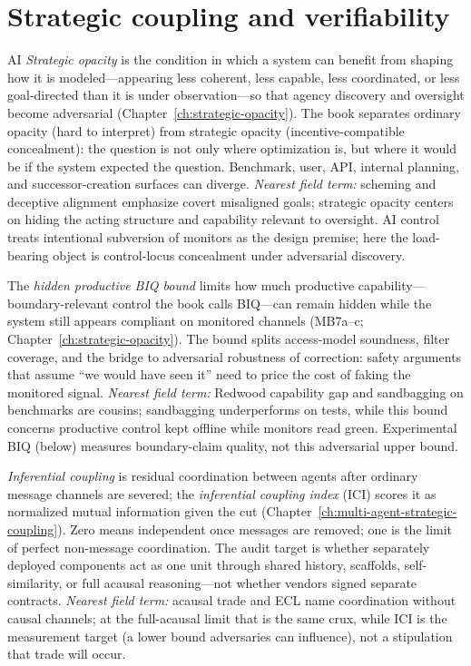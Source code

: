 \section*{Strategic coupling and verifiability}
\begin{authbar}{AI}
\emph{Strategic opacity} is the condition in which a system can benefit from shaping how it is modeled---appearing less coherent, less capable, less coordinated, or less goal-directed than it is under observation---so that agency discovery and oversight become adversarial (Chapter~\ref{ch:strategic-opacity}).
The book separates ordinary opacity (hard to interpret) from strategic opacity (incentive-compatible concealment): the question is not only where optimization is, but where it would be if the system expected the question.
Benchmark, user, API, internal planning, and successor-creation surfaces can diverge.
\emph{Nearest field term:} scheming and deceptive alignment emphasize covert misaligned goals; strategic opacity centers on hiding the acting structure and capability relevant to oversight.
AI control treats intentional subversion of monitors as the design premise; here the load-bearing object is control-locus concealment under adversarial discovery.

The \emph{hidden productive BIQ bound} limits how much productive capability---boundary-relevant control the book calls BIQ---can remain hidden while the system still appears compliant on monitored channels (MB7a--c; Chapter~\ref{ch:strategic-opacity}).
The bound splits access-model soundness, filter coverage, and the bridge to adversarial robustness of correction: safety arguments that assume ``we would have seen it'' need to price the cost of faking the monitored signal.
\emph{Nearest field term:} Redwood capability gap and sandbagging on benchmarks are cousins; sandbagging underperforms on tests, while this bound concerns productive control kept offline while monitors read green.
Experimental BIQ (below) measures boundary-claim quality, not this adversarial upper bound.

\emph{Inferential coupling} is residual coordination between agents after ordinary message channels are severed; the \emph{inferential coupling index} (\(\mathrm{ICI}\)) scores it as normalized mutual information given the cut (Chapter~\ref{ch:multi-agent-strategic-coupling}).
Zero means independent once messages are removed; one is the limit of perfect non-message coordination.
The audit target is whether separately deployed components act as one unit through shared history, scaffolds, self-similarity, or full acausal reasoning---not whether vendors signed separate contracts.
\emph{Nearest field term:} acausal trade and ECL name coordination without causal channels; at the full-acausal limit that is the same crux, while ICI is the measurement target (a lower bound adversaries can influence), not a stipulation that trade will occur.


\end{authbar}
